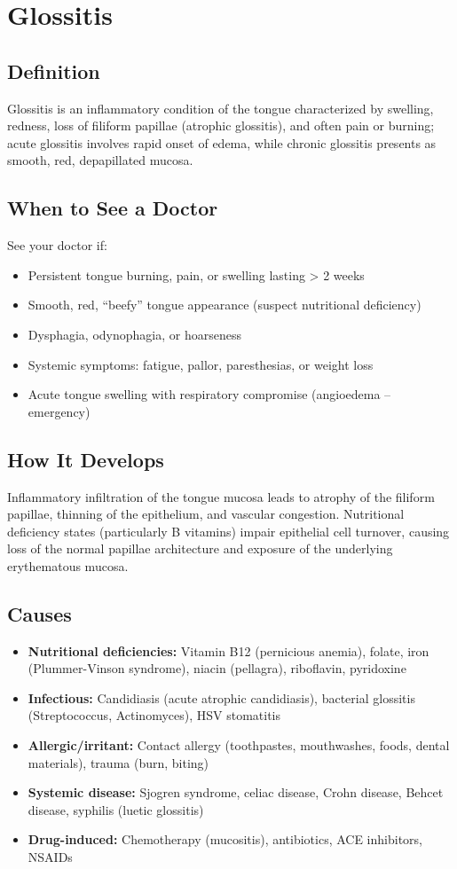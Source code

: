 \chapter{Glossitis}

\section*{Definition}
Glossitis is an inflammatory condition of the tongue characterized by swelling, redness, loss of filiform papillae (atrophic glossitis), and often pain or burning; acute glossitis involves rapid onset of edema, while chronic glossitis presents as smooth, red, depapillated mucosa.

\section*{When to See a Doctor}
See your doctor if:
\begin{itemize}
  \item Persistent tongue burning, pain, or swelling lasting > 2 weeks
  \item Smooth, red, ``beefy'' tongue appearance (suspect nutritional deficiency)
  \item Dysphagia, odynophagia, or hoarseness
  \item Systemic symptoms: fatigue, pallor, paresthesias, or weight loss
  \item Acute tongue swelling with respiratory compromise (angioedema -- emergency)
\end{itemize}

\section*{How It Develops}
Inflammatory infiltration of the tongue mucosa leads to atrophy of the filiform papillae, thinning of the epithelium, and vascular congestion. Nutritional deficiency states (particularly B vitamins) impair epithelial cell turnover, causing loss of the normal papillae architecture and exposure of the underlying erythematous mucosa.

\section*{Causes}
\begin{itemize}
  \item \textbf{Nutritional deficiencies:} Vitamin B12 (pernicious anemia), folate, iron (Plummer-Vinson syndrome), niacin (pellagra), riboflavin, pyridoxine
  \item \textbf{Infectious:} Candidiasis (acute atrophic candidiasis), bacterial glossitis (Streptococcus, Actinomyces), HSV stomatitis
  \item \textbf{Allergic/irritant:} Contact allergy (toothpastes, mouthwashes, foods, dental materials), trauma (burn, biting)
  \item \textbf{Systemic disease:} Sjogren syndrome, celiac disease, Crohn disease, Behcet disease, syphilis (luetic glossitis)
  \item \textbf{Drug-induced:} Chemotherapy (mucositis), antibiotics, ACE inhibitors, NSAIDs
\end{itemize}

